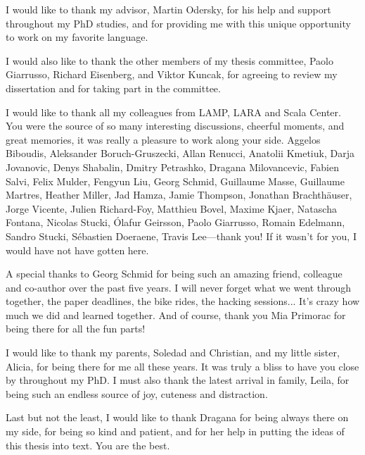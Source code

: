 I would like to thank my advisor, Martin Odersky, for his help and support throughout my PhD studies, and for providing me with this unique opportunity to work on my favorite language.

I would also like to thank the other members of my thesis committee, Paolo Giarrusso, Richard Eisenberg, and Viktor Kuncak, for agreeing to review my dissertation and for taking part in the committee.

I would like to thank all my colleagues from LAMP, LARA and Scala Center.
You were the source of so many interesting discussions, cheerful moments, and great memories, it was really a pleasure to work along your side.
Aggelos Biboudis,
Aleksander Boruch-Gruszecki,
Allan Renucci,
Anatolii Kmetiuk,
Darja Jovanovic,
Denys Shabalin,
Dmitry Petrashko,
Dragana Milovancevic,
Fabien Salvi,
Felix Mulder,
Fengyun Liu,
Georg Schmid,
Guillaume Masse,
Guillaume Martres,
Heather Miller,
Jad Hamza,
Jamie Thompson,
Jonathan Brachthäuser,
Jorge Vicente,
Julien Richard-Foy,
Matthieu Bovel,
Maxime Kjaer,
Natascha Fontana,
Nicolas Stucki,
Ólafur Geirsson,
Paolo Giarrusso,
Romain Edelmann,
Sandro Stucki,
Sébastien Doeraene,
Travis Lee---thank you!
If it wasn't for you, I would have not have gotten here.

A special thanks to Georg Schmid for being such an amazing friend, colleague and co-author over the past five years.
I will never forget what we went through together, the paper deadlines, the bike rides, the hacking sessions...
It's crazy how much we did and learned together.
And of course, thank you Mia Primorac for being there for all the fun parts!

I would like to thank my parents, Soledad and Christian, and my little sister, Alicia, for being there for me all these years.
It was truly a bliss to have you close by throughout my PhD.
I must also thank the latest arrival in family, Leila, for being such an endless source of joy, cuteness and distraction.

Last but not the least, I would like to thank Dragana for being always there on my side, for being so kind and patient, and for her help in putting the ideas of this thesis into text.
You are the best.

